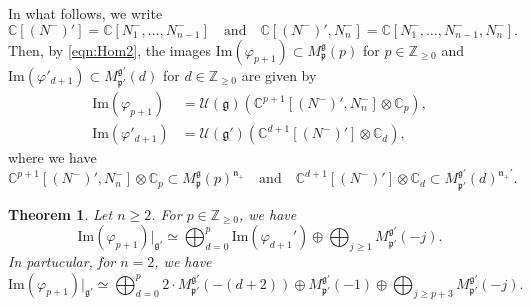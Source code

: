 \documentclass[reqno,11pt]{amsart}
\newtheorem{thm}[equation]{Theorem}
\theoremstyle{remark}
\theoremstyle{definition}
\numberwithin{equation}{section}
\newcommand{\fg}{{\mathfrak g}}
\newcommand{\fn}{{\mathfrak n}}
\newcommand{\fp}{{\mathfrak p}}
\newcommand{\C}{\mathbb{C}}
\newcommand{\Z}{\mathbb{Z}}
\newcommand{\Cal}{\mathcal}
\renewcommand{\Im}{\mathrm{Im}}
\newcommand{\Mp}{M^{\fg}_{\fp}}
\newcommand{\Mpp}{M^{\fg'}_{\fp'}}
\begin{document}
In what follows, we write
\begin{equation*}
\C[(N^-)']=
\C[N_1^-,\ldots, N_{n-1}^-]
\quad 
\text{and}
\quad
\C[(N^-)', N_n^-]=\C[N_1^-,\ldots, N_{n-1}^-, N_n^-].
\end{equation*}
Then, by \eqref{eqn:Hom2},
the images
 $\Im(\varphi_{p+1}) \subset \Mp(p)$ for $p \in \Z_{\geq 0}$
and
$\Im(\varphi'_{d+1}) \subset \Mpp(d)$ for $d \in \Z_{\geq 0}$
are given by
\begin{align}
\Im(\varphi_{p+1}) &= 
\Cal{U}(\fg)\left(
\C^{p+1}[(N^-)', N_n^-] \otimes \C_p
\right), \label{eqn:M30A}\\
\Im(\varphi'_{d+1}) &= \Cal{U}(\fg')\left(
\C^{d+1}[(N^-)'] \otimes \C_d
\right),\label{eqn:M30B}
\end{align}
where we have 
\begin{equation}\label{eqn:M30D}
\C^{p+1}[(N^-)', N_n^-] \otimes \C_p
\subset \Mp(p)^{\fn_+}
\quad
\text{and}
\quad
\C^{d+1}[(N^-)'] \otimes \C_d
\subset \Mpp(d)^{\fn_+'}.
\end{equation}

\begin{thm}\label{thm:GVM31b}
Let $n\geq 2$. For $p \in \Z_{\geq 0}$, we have 
\begin{equation}\label{eqn:GVM31A}
\Im(\varphi_{p+1})\vert_{\fg'} \simeq 
\bigoplus_{d=0}^p \Im (\varphi_{d+1}') \oplus \bigoplus_{j \geq 1} \Mpp(-j).
\end{equation}
In partucular, for $n=2$, we have 
\begin{equation}\label{eqn:GVM31B}
\Im(\varphi_{p+1})\vert_{\fg'} \simeq 
\bigoplus_{d=0}^p 2 \cdot \Mpp(-(d+2)) \oplus \Mpp(-1) \oplus 
\bigoplus_{j\geq p+3} \Mpp(-j).
\end{equation}
\end{thm}
\end{document}
